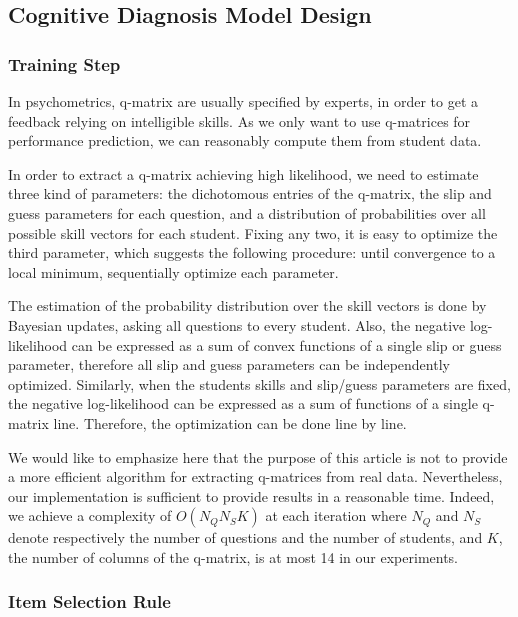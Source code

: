 \documentclass{edm_template}
\begin{document}
\subsection{Cognitive Diagnosis Model Design}

\subsubsection{Training Step}

In psychometrics, q-matrix are usually specified by experts, in order to get a feedback relying on intelligible skills. As we only want to use q-matrices for performance prediction, we can reasonably compute them from student data.

In order to extract a q-matrix achieving high likelihood, we need to estimate three kind of parameters: the dichotomous entries of the q-matrix, the slip and guess parameters for each question, and a distribution of probabilities over all possible skill vectors for each student. Fixing any two, it is easy to optimize the third parameter, which suggests the following procedure: until convergence to a local minimum, sequentially optimize each parameter.

The estimation of the probability distribution over the skill vectors is done by Bayesian updates, asking all questions to every student. Also, the negative log-likelihood can be expressed as a sum of convex functions of a single slip or guess parameter, therefore all slip and guess parameters can be independently optimized.  Similarly, when the students skills and slip/guess parameters are fixed, the negative log-likelihood can be expressed as a sum of functions of a single q-matrix line. Therefore, the optimization can be done line by line. %

We would like to emphasize here that the purpose of this article is not to provide a more efficient algorithm for extracting q-matrices from real data. Nevertheless, our implementation is sufficient to provide results in a reasonable time. Indeed, we achieve a complexity of $O(N_Q N_S K)$ at each iteration where $N_Q$ and $N_S$ denote respectively the number of questions and the number of students, and $K$, the number of columns of the q-matrix, is at most 14 in our experiments.

\subsubsection{Item Selection Rule}
\end{document}
